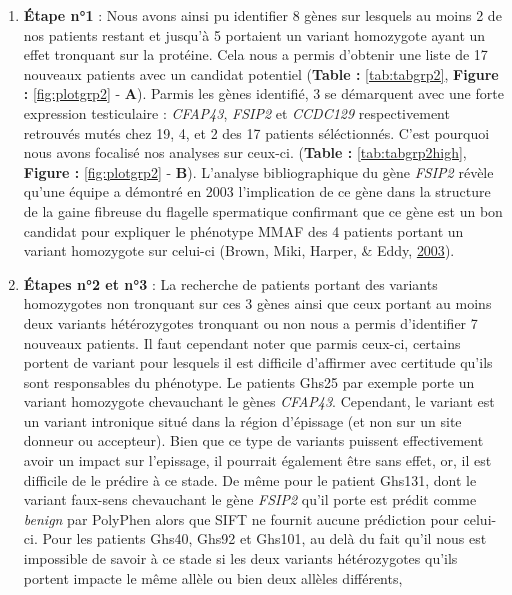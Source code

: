 \documentclass[12pt,twoside]{reedthesis}
\theoremstyle{definition}
\theoremstyle{definition}
\theoremstyle{remark}
\begin{document}
  \begin{enumerate}
  \def\labelenumi{\arabic{enumi}.}
  \item
    \textbf{Étape n°1} : Nous avons ainsi pu identifier 8 gènes sur
    lesquels au moins 2 de nos patients restant et jusqu'à 5 portaient un
    variant homozygote ayant un effet tronquant sur la protéine. Cela nous
    a permis d'obtenir une liste de 17 nouveaux patients avec un candidat
    potentiel (\textbf{Table :} \ref{tab:tabgrp2}, \textbf{Figure :}
    \ref{fig:plotgrp2} - \textbf{A}). Parmis les gènes identifié, 3 se
    démarquent avec une forte expression testiculaire : \emph{CFAP43},
    \emph{FSIP2} et \emph{CCDC129} respectivement retrouvés mutés chez 19,
    4, et 2 des 17 patients séléctionnés. C'est pourquoi nous avons
    focalisé nos analyses sur ceux-ci. (\textbf{Table :
    }\ref{tab:tabgrp2high}, \textbf{Figure :} \ref{fig:plotgrp2} -
    \textbf{B}). L'analyse bibliographique du gène \emph{FSIP2} révèle
    qu'une équipe a démontré en 2003 l'implication de ce gène dans la
    structure de la gaine fibreuse du flagelle spermatique confirmant que
    ce gène est un bon candidat pour expliquer le phénotype MMAF des 4
    patients portant un variant homozygote sur celui-ci (Brown, Miki,
    Harper, \& Eddy, \protect\hyperlink{ref-Brown2003}{2003}).
  \item
    \textbf{Étapes n°2 et n°3} : La recherche de patients portant des
    variants homozygotes non tronquant sur ces 3 gènes ainsi que ceux
    portant au moins deux variants hétérozygotes tronquant ou non nous a
    permis d'identifier 7 nouveaux patients. Il faut cependant noter que
    parmis ceux-ci, certains portent de variant pour lesquels il est
    difficile d'affirmer avec certitude qu'ils sont responsables du
    phénotype. Le patients Ghs25 par exemple porte un variant homozygote
    chevauchant le gènes \emph{CFAP43}. Cependant, le variant est un
    variant intronique situé dans la région d'épissage (et non sur un site
    donneur ou accepteur). Bien que ce type de variants puissent
    effectivement avoir un impact sur l'epissage, il pourrait également
    être sans effet, or, il est difficile de le prédire à ce stade. De
    même pour le patient Ghs131, dont le variant faux-sens chevauchant le
    gène \emph{FSIP2} qu'il porte est prédit comme \emph{benign} par
    PolyPhen alors que SIFT ne fournit aucune prédiction pour celui-ci.
    Pour les patients Ghs40, Ghs92 et Ghs101, au delà du fait qu'il nous
    est impossible de savoir à ce stade si les deux variants hétérozygotes
    qu'ils portent impacte le même allèle ou bien deux allèles différents,

\end{enumerate}
\end{document}
